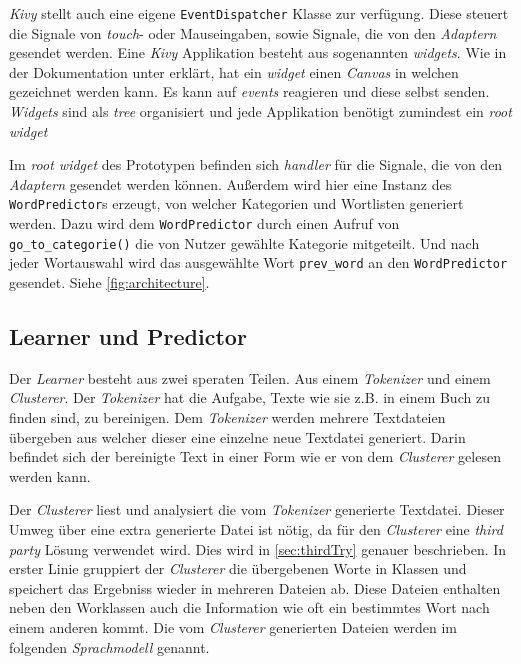         \emph{Kivy} stellt auch eine eigene \texttt{EventDispatcher} Klasse zur verfügung. Diese steuert die Signale von \emph{touch}- oder Mauseingaben, sowie Signale, die von den \emph{Adaptern} gesendet werden. Eine \emph{Kivy} Applikation besteht aus sogenannten \emph{widgets}. Wie in der Dokumentation unter \cite{kivy:widgets} erklärt, hat ein \emph{widget} einen \emph{Canvas} in welchen gezeichnet werden kann. Es kann auf \emph{events} reagieren und diese selbst senden. \emph{Widgets} sind als \emph{tree} organisiert und jede Applikation benötigt zumindest ein \emph{root widget}
        
        Im \emph{root widget} des Prototypen befinden sich \emph{handler} für die Signale, die von den \emph{Adaptern} gesendet werden können. Außerdem wird hier eine Instanz des \texttt{WordPredictor}s erzeugt, von welcher Kategorien und Wortlisten generiert werden. Dazu wird dem \texttt{WordPredictor} durch einen Aufruf von \texttt{go\_to\_categorie()} die von Nutzer gewählte Kategorie mitgeteilt. Und nach jeder Wortauswahl wird das ausgewählte Wort \texttt{prev\_word} an den \texttt{WordPredictor} gesendet. Siehe \autoref{fig:architecture}.
        
    \newpage
	\subsection{Learner und Predictor}
    \label{sec:design-learnerPredictor}
    
    	Der \emph{Learner} besteht aus zwei speraten Teilen. Aus einem \emph{Tokenizer} und einem \emph{Clusterer}. Der \emph{Tokenizer} hat die Aufgabe, Texte wie sie z.B. in einem Buch zu finden sind, zu bereinigen. Dem \emph{Tokenizer} werden mehrere Textdateien übergeben aus welcher dieser eine einzelne neue Textdatei generiert. Darin befindet sich der bereinigte Text in einer Form wie er von dem \emph{Clusterer} gelesen werden kann.

		Der \emph{Clusterer} liest und analysiert die vom \emph{Tokenizer} generierte Textdatei. Dieser Umweg über eine extra generierte Datei ist nötig, da für den \emph{Clusterer} eine \emph{third party} Lösung verwendet wird. Dies wird in \autoref{sec:thirdTry} genauer beschrieben. In erster Linie gruppiert der \emph{Clusterer} die übergebenen Worte in Klassen und speichert das Ergebniss wieder in mehreren Dateien ab. Diese Dateien enthalten neben den Worklassen auch die Information wie oft ein bestimmtes Wort nach einem anderen kommt. Die vom \emph{Clusterer} generierten Dateien werden im folgenden \emph{Sprachmodell} genannt.

